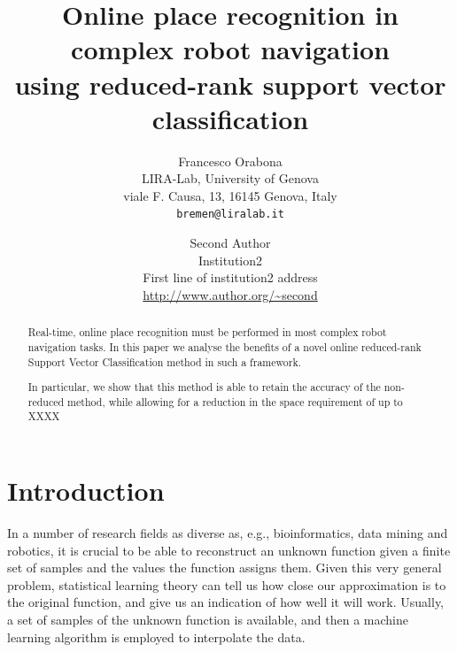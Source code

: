 \documentclass[10pt,twocolumn,letterpaper]{article}
\begin{document}

\title{Online place recognition in complex robot navigation \\
using reduced-rank support vector classification}

\author{Francesco Orabona\\
LIRA-Lab, University of Genova\\
viale F. Causa, 13, 16145 Genova, Italy\\
{\tt\small bremen@liralab.it}
\and
Second Author\\
Institution2\\
First line of institution2 address\\
{\small\url{http://www.author.org/~second}}
}

\maketitle


\begin{abstract}
  Real-time, online place recognition must be performed in most
  complex robot navigation tasks. In this paper we analyse the
  benefits of a novel online reduced-rank Support Vector
  Classification method in such a framework.

  In particular, we show that this method is able to retain the
  accuracy of the non-reduced method, while allowing for a reduction
  in the space requirement of up to XXXX%
\end{abstract}


\section{Introduction}

In a number of research fields as diverse as, e.g., bioinformatics,
data mining and robotics, it is crucial to be able to reconstruct an
unknown function given a finite set of samples and the values the
function assigns them. Given this very general problem, statistical
learning theory \cite{v-edbed-82} can tell us how close our
approximation is to the original function, and give us an indication
of how well it will work. Usually, a set of samples of the unknown
function is available, and then a machine learning algorithm is
employed to interpolate the data.
\end{document}
